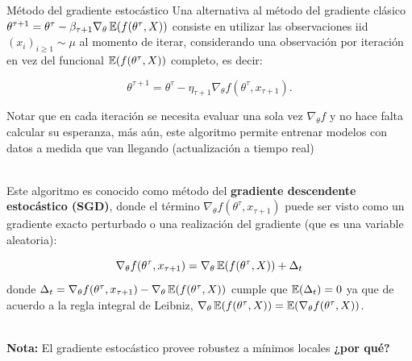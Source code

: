 \documentclass[handout, 9pt]{beamer}
\begin{document}
\begin{frame}{Método del gradiente estocástico }
Una alternativa al método del gradiente clásico $\theta^{\tau+1} = \theta^\tau - \beta_{\tau+1}\nabla_\theta \operatorname{\mathbb{E}}(f(\theta^\tau,X))$ consiste en utilizar las observaciones iid $(x_i)_{i\geq 1}\sim\mu$ al momento de iterar, considerando una observación por iteración en vez del funcional $\operatorname{\mathbb{E}}(f(\theta^\tau,X))$ completo, es decir: \pause 

\begin{equation*}
  \theta^{\tau+1} = \theta^\tau - \eta_{\tau+1}\nabla_\theta f(\theta^\tau,x_{\tau+1}).
\end{equation*} \pause 

Notar que en cada iteración se necesita evaluar una sola vez $\nabla_\theta f$ y no hace falta calcular su esperanza, más aún, este algoritmo permite entrenar modelos con datos a medida que van llegando (actualización a tiempo real) \\~\

Este algoritmo es conocido como método del \textbf{gradiente descendente estocástico (SGD)}, donde el término $\nabla_\theta f(\theta^\tau,x_{\tau+1})$ puede ser visto como un gradiente exacto perturbado o una realización del gradiente (que es una variable aleatoria): \pause 

\begin{equation*}
  \nabla_\theta f(\theta^\tau,x_{\tau+1}) = \nabla_\theta\operatorname{\mathbb{E}}(f(\theta^\tau,X)) + \Delta_t
\end{equation*} \pause 
donde $\Delta_t = \nabla_\theta f(\theta^\tau,x_{\tau+1}) - \nabla_\theta \operatorname{\mathbb{E}}( f(\theta^\tau,X))$ cumple que $\operatorname{\mathbb{E}}(\Delta_t)=0$ ya que de acuerdo a la regla integral de Leibniz, $\nabla_\theta \operatorname{\mathbb{E}}( f(\theta^\tau,X)) =  \operatorname{\mathbb{E}}(\nabla_\theta f(\theta^\tau,X))$.\\~\


\textbf{Nota:} El gradiente estocástico provee robustez a mínimos locales \textbf{¿por qué?}


\end{frame}
\end{document}
